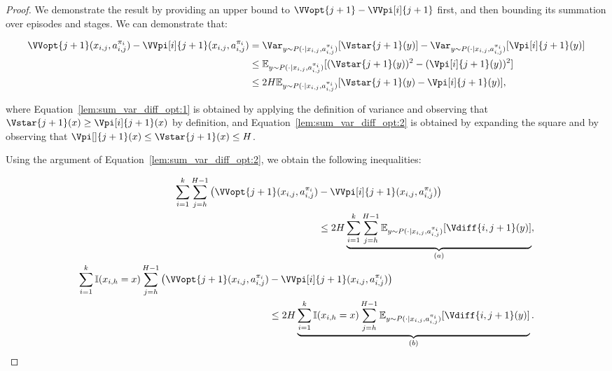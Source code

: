 \begin{proof}
We demonstrate the result by providing an upper bound to $\VVopt{j+1} - \VVpi[i]{j+1}$ first, and then bounding its summation over episodes and stages.
We can demonstrate that:

\begin{align}
    \VVopt{j+1} (x_{i,j}, a_{i,j}^{\pi_i}) - \VVpi[i]{j+1} (x_{i,j}, a_{i,j}^{\pi_i}) &= \Var_{y \sim P(\cdot | x_{i,j}, a_{i,j}^{\pi_i})} [\Vstar{j+1}(y)] - \Var_{y \sim P(\cdot | x_{i,j}, a_{i,j}^{\pi_i})} [\Vpi[i]{j+1} (y)] \nonumber \\
    &\le \mathbb{E}_{y \sim P(\cdot | x_{i,j}, a_{i,j}^{\pi_i})} [(\Vstar{j+1}(y))^2 - (\Vpi[i]{j+1}(y))^2] \label{lem:sum_var_diff_opt:1} \\
    &\le 2H \mathbb{E}_{y \sim P(\cdot | x_{i,j}, a_{i,j}^{\pi_i})} [\Vstar{j+1}(y) - \Vpi[i]{j+1}(y)] \label{lem:sum_var_diff_opt:2},
\end{align}

where Equation~\eqref{lem:sum_var_diff_opt:1} is obtained by applying the definition of variance and observing that $\Vstar{j+1}(x) \ge \Vpi[i]{j+1}(x)$ by definition, and Equation~\eqref{lem:sum_var_diff_opt:2} is obtained by expanding the square and by observing that $\Vpi[]{j+1}(x) \le \Vstar{j+1}(x) \le H$.

Using the argument of Equation~\eqref{lem:sum_var_diff_opt:2}, we obtain the following inequalities:

\begin{align}
    \begin{split}
    \label{lem:sum_var_diff_opt:3}
    \sum_{i=1}^k \sum_{j=h}^{H-1} \big( \VVopt{j+1} (x_{i,j}, a_{i,j}^{\pi_i}) &- \VVpi[i]{j+1} (x_{i,j}, a_{i,j}^{\pi_i}) \big) \\
    &\le 2 H \underbrace{\sum_{i=1}^k \sum_{j=h}^{H-1} \mathbb{E}_{y \sim P(\cdot | x_{i,j}, a_{i,j}^{\pi_i})} [\Vdiff{i,j+1}(y)]}_{(a)},
    \end{split} \\
    \begin{split}
    \label{lem:sum_var_diff_opt:4}
    \sum_{i=1}^k \mathbb{I}(x_{i,h}=x) \sum_{j=h}^{H-1} \big( \VVopt{j+1} (x_{i,j}, a_{i,j}^{\pi_i}) &- \VVpi[i]{j+1} (x_{i,j}, a_{i,j}^{\pi_i}) \big) \\
    &\le 2 H \underbrace{\sum_{i=1}^k \mathbb{I}(x_{i,h}=x) \sum_{j=h}^{H-1} \mathbb{E}_{y \sim P(\cdot | x_{i,j}, a_{i,j}^{\pi_i})} [\Vdiff{i,j+1}(y)]}_{(b)}.
    \end{split}
\end{align}


\end{proof}
